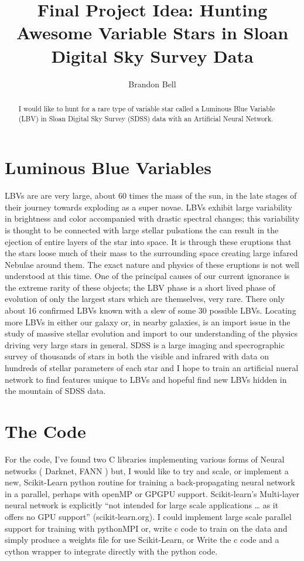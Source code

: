 \documentclass{IEEEtran}
\begin{document}
\title{Final Project Idea: Hunting Awesome Variable Stars in Sloan Digital Sky
Survey Data}
\author{Brandon Bell}
\maketitle
\begin{abstract}
I would like to hunt for a rare type of variable star called a Luminous Blue
Variable (LBV) in Sloan Digital Sky Survey (SDSS) data with an Artificial
Neural Network.
\end{abstract}

\section{Luminous Blue Variables}
LBVs are are very large, about 60 times the mass of the sun, in the late stages
of their journey towards exploding as a super novae. LBVs exhibit large
variability in brightness and color accompanied with drastic spectral changes;
this variability is thought to be connected with large stellar pulsations the
can result in the ejection of entire layers of the star into space. It is
through these eruptions that the stars loose much of their mass to the
surrounding space creating large infared Nebulae around them. The exact nature
and physics of these eruptions is not well understood at this time. One of the
principal causes of our current ignorance is the extreme rarity of these
objects; the LBV phase is a short lived phase of evolution of only the largest
stars which are themselves, very rare. There only about 16 confirmed LBVs known
with a slew of some 30 possible LBVs. Locating more LBVs in either our galaxy
or, in nearby galaxies, is an import issue in the study of  massive stellar
evolution and import to our understanding of the physics driving very large
stars in general. SDSS is a large imaging and specrographic survey of thousands
of stars in both the visible and infrared with data on hundreds of stellar
parameters of each star and I hope to train an artificial nueral network to
find features unique to LBVs and hopeful find new LBVs hidden in the mountain
of SDSS data.

\section{The Code }
For the code, I’ve found two C libraries implementing various forms of Neural
networks ( Darknet, FANN ) but, I would like to try and scale, or implement a
new, Scikit-Learn python routine for training a back-propagating neural network
in a parallel, perhaps with openMP or GPGPU support. Scikit-learn’s Multi-layer
neural network is explicitly “not intended for large scale applications … as it
offers no GPU support” (scikit-learn.org). I could implement large scale
parallel support for training with pythonMPI or, write c code to train on the
data and simply produce a weights file for use Scikit-Learn, or Write the c
code and a cython wrapper to integrate directly with the python code.
\end{document}
